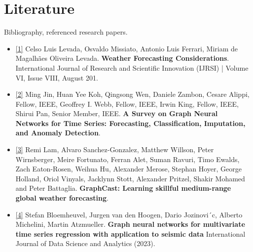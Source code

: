 \documentclass{article}
\begin{document}
	\section{Literature}
	Bibliography, referenced research papers.
    \begin{itemize}
        \item \href{https://www.rsisinternational.org/journals/ijrsi/digital-library/volume-6-issue-8/86-90.pdf}{[1]} Celso Luis Levada, Osvaldo Missiato, Antonio Luis Ferrari, Miriam de Magalhães Oliveira Levada. \textbf{Weather Forecasting Considerations}. International Journal of Research and Scientific Innovation (IJRSI) | Volume VI, Issue VIII, August 201.
        \item \href{https://arxiv.org/pdf/2307.03759.pdf}{[2]} Ming Jin, Huan Yee Koh, Qingsong Wen, Daniele Zambon, Cesare Alippi, Fellow, IEEE, Geoffrey I. Webb, Fellow, IEEE, Irwin King, Fellow, IEEE, Shirui Pan, Senior Member, IEEE. \textbf{A Survey on Graph Neural Networks for Time Series: Forecasting, Classification, Imputation, and Anomaly Detection}.
        \item \href{https://arxiv.org/pdf/2212.12794.pdf}{[3]} Remi Lam, Alvaro Sanchez-Gonzalez, Matthew Willson, Peter Wirnsberger, Meire Fortunato, Ferran Alet, Suman Ravuri, Timo Ewalds, Zach Eaton-Rosen, Weihua Hu, Alexander Merose, Stephan Hoyer, George Holland, Oriol Vinyals, Jacklynn Stott, Alexander Pritzel, Shakir Mohamed and Peter Battaglia. \textbf{GraphCast: Learning skillful medium-range global weather forecasting}.
        \item \href{https://link.springer.com/article/10.1007/s41060-022-00349-6}{[4]}
        Stefan Bloemheuvel, Jurgen van den Hoogen, Dario Jozinovi´c, Alberto Michelini, Martin Atzmueller. \textbf{Graph neural networks for multivariate time series regression with application to seismic data} International Journal of Data Science and Analytics (2023).
    \end{itemize}
	
\end{document}
